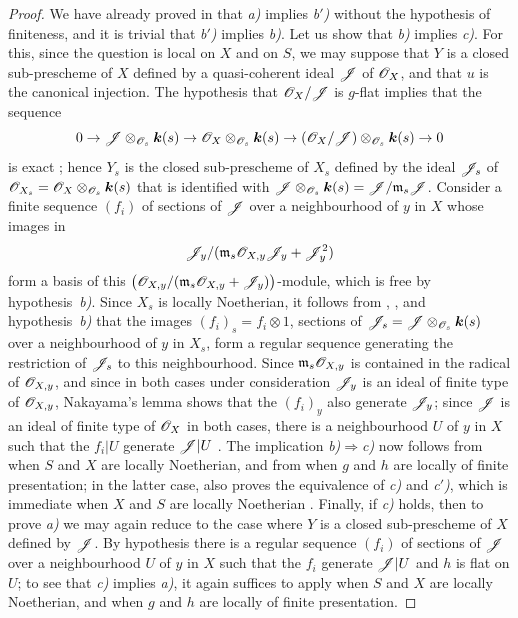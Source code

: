 \begin{proof}
We have already proved in  that \emph{a)} implies \emph{b$'$)} without the hypothesis of finiteness, and it is trivial that \emph{b$'$)} implies \emph{b)}.
Let us show that \emph{b)} implies \emph{c)}.
For this, since the question is local on $X$ and on $S$, we may suppose that $Y$ is a closed sub-prescheme of $X$ defined by a quasi-coherent ideal $\mathscr{J}$ of $\mathscr{O}_X$, and that $u$ is the canonical injection.
The hypothesis that $\mathscr{O}_X/\mathscr{J}$ is $g$-flat implies that the sequence
\[
  0\to\mathscr{J}\otimes_{\mathscr{O}_s}\boldsymbol{k}(s)\to\mathscr{O}_X\otimes_{\mathscr{O}_s}\boldsymbol{k}(s)\to(\mathscr{O}_X/\mathscr{J})\otimes_{\mathscr{O}_s}\boldsymbol{k}(s)\to 0
\]
is exact ; hence $Y_s$ is the closed sub-prescheme of $X_s$ defined by the ideal $\mathscr{J}_s$ of $\mathscr{O}_{X_s}=\mathscr{O}_X\otimes_{\mathscr{O}_s}\boldsymbol{k}(s)$ that is identified with $\mathscr{J}\otimes_{\mathscr{O}_s}\boldsymbol{k}(s)=\mathscr{J}/\mathfrak{m}_s\mathscr{J}$.
Consider a finite sequence $(f_i)$ of sections of $\mathscr{J}$ over a neighbourhood of $y$ in $X$ whose images in
\[
  \mathscr{J}_y/(\mathfrak{m}_s\mathscr{O}_{X,y}\mathscr{J}_y+\mathscr{J}_y^2)
\]
form a basis of this $\bigl(\mathscr{O}_{X,y}/(\mathfrak{m}_s\mathscr{O}_{X,y}+\mathscr{J}_y)\bigr)$-module, which is free by hypothesis~\emph{b)}.
Since $X_s$ is locally Noetherian, it follows from ,
, and hypothesis~\emph{b)} that the images $(f_i)_s=f_i\otimes 1$, sections of $\mathscr{J}_s=\mathscr{J}\otimes_{\mathscr{O}_s}\boldsymbol{k}(s)$ over a neighbourhood of $y$ in $X_s$, form a regular sequence generating the restriction of $\mathscr{J}_s$ to this neighbourhood.
Since $\mathfrak{m}_s\mathscr{O}_{X,y}$ is contained in the radical of $\mathscr{O}_{X,y}$, and since in both cases under consideration $\mathscr{J}_y$ is an ideal of finite type of $\mathscr{O}_{X,y}$, Nakayama's lemma shows that the $(f_i)_y$ also generate $\mathscr{J}_y$; since $\mathscr{J}$ is an ideal of finite type of $\mathscr{O}_X$ in both cases, there is a neighbourhood $U$ of $y$ in $X$ such that the $f_i|U$ generate $\mathscr{J}|U$ .
The implication \emph{b)}$\Rightarrow$\emph{c)} now follows from  when $S$ and $X$ are locally Noetherian, and from  when $g$ and $h$ are locally of finite presentation; in the latter case,  also proves the equivalence of \emph{c)} and \emph{c$'$)}, which is immediate when $X$ and $S$ are locally Noetherian .
Finally, if \emph{c)} holds, then to prove \emph{a)} we may again reduce to the case where $Y$ is a closed sub-prescheme of $X$ defined by $\mathscr{J}$. By hypothesis there is a regular sequence $(f_i)$ of sections of $\mathscr{J}$ over a neighbourhood $U$ of $y$ in $X$ such that the $f_i$ generate $\mathscr{J}|U$ and $h$ is flat on $U$; to see that \emph{c)} implies \emph{a)}, it again suffices to apply  when $S$ and $X$ are locally Noetherian, and  when $g$ and $h$ are locally of finite presentation.
\end{proof}

